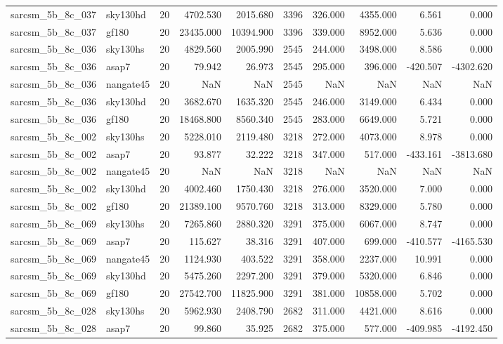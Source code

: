 \begin{tabular}{llrrrrrrrr}
sarcsm\_5b\_8c\_037 & sky130hd & 20 & 4702.530 & 2015.680 & 3396 & 326.000 & 4355.000 & 6.561 & 0.000 \\
sarcsm\_5b\_8c\_037 & gf180 & 20 & 23435.000 & 10394.900 & 3396 & 339.000 & 8952.000 & 5.636 & 0.000 \\
sarcsm\_5b\_8c\_036 & sky130hs & 20 & 4829.560 & 2005.990 & 2545 & 244.000 & 3498.000 & 8.586 & 0.000 \\
sarcsm\_5b\_8c\_036 & asap7 & 20 & 79.942 & 26.973 & 2545 & 295.000 & 396.000 & -420.507 & -4302.620 \\
sarcsm\_5b\_8c\_036 & nangate45 & 20 & NaN & NaN & 2545 & NaN & NaN & NaN & NaN \\
sarcsm\_5b\_8c\_036 & sky130hd & 20 & 3682.670 & 1635.320 & 2545 & 246.000 & 3149.000 & 6.434 & 0.000 \\
sarcsm\_5b\_8c\_036 & gf180 & 20 & 18468.800 & 8560.340 & 2545 & 283.000 & 6649.000 & 5.721 & 0.000 \\
sarcsm\_5b\_8c\_002 & sky130hs & 20 & 5228.010 & 2119.480 & 3218 & 272.000 & 4073.000 & 8.978 & 0.000 \\
sarcsm\_5b\_8c\_002 & asap7 & 20 & 93.877 & 32.222 & 3218 & 347.000 & 517.000 & -433.161 & -3813.680 \\
sarcsm\_5b\_8c\_002 & nangate45 & 20 & NaN & NaN & 3218 & NaN & NaN & NaN & NaN \\
sarcsm\_5b\_8c\_002 & sky130hd & 20 & 4002.460 & 1750.430 & 3218 & 276.000 & 3520.000 & 7.000 & 0.000 \\
sarcsm\_5b\_8c\_002 & gf180 & 20 & 21389.100 & 9570.760 & 3218 & 313.000 & 8329.000 & 5.780 & 0.000 \\
sarcsm\_5b\_8c\_069 & sky130hs & 20 & 7265.860 & 2880.320 & 3291 & 375.000 & 6067.000 & 8.747 & 0.000 \\
sarcsm\_5b\_8c\_069 & asap7 & 20 & 115.627 & 38.316 & 3291 & 407.000 & 699.000 & -410.577 & -4165.530 \\
sarcsm\_5b\_8c\_069 & nangate45 & 20 & 1124.930 & 403.522 & 3291 & 358.000 & 2237.000 & 10.991 & 0.000 \\
sarcsm\_5b\_8c\_069 & sky130hd & 20 & 5475.260 & 2297.200 & 3291 & 379.000 & 5320.000 & 6.846 & 0.000 \\
sarcsm\_5b\_8c\_069 & gf180 & 20 & 27542.700 & 11825.900 & 3291 & 381.000 & 10858.000 & 5.702 & 0.000 \\
sarcsm\_5b\_8c\_028 & sky130hs & 20 & 5962.930 & 2408.790 & 2682 & 311.000 & 4421.000 & 8.616 & 0.000 \\
sarcsm\_5b\_8c\_028 & asap7 & 20 & 99.860 & 35.925 & 2682 & 375.000 & 577.000 & -409.985 & -4192.450 \\

\end{tabular}
